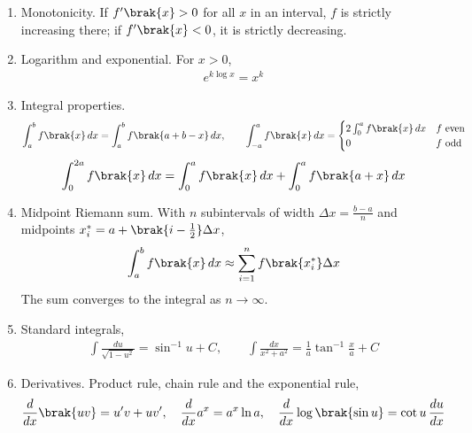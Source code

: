 \begin{enumerate}[label=\thesubsection.\arabic*, ref=\thesubsection.\theenumi]
\item Monotonicity. If $f^{\prime}\brak{x} > 0$ for all $x$ in an interval, $f$ is strictly increasing there; if $f^{\prime}\brak{x} < 0$, it is strictly decreasing. 
\item Logarithm and exponential. For $x > 0$,
\begin{align}
	e^{k\log x} = x^k \label{eq:CBSE12-explog}
\end{align}
\item Integral properties.
\begin{align}
	\int_a^b f\brak{x}\,dx = \int_a^b f\brak{a+b-x}\,dx, \qquad
	\int_{-a}^{a} f\brak{x}\,dx = \begin{cases} 2\int_0^a f\brak{x}\,dx & f \text{ even} \\ 0 & f \text{ odd} \end{cases} \label{eq:CBSE12-intprop}
\end{align}
\begin{align}
	\int_0^{2a} f\brak{x}\,dx = \int_0^{a} f\brak{x}\,dx + \int_0^{a} f\brak{a+x}\,dx \label{eq:CBSE12-split}
\end{align}
\item Midpoint Riemann sum. With $n$ subintervals of width $\Delta x = \frac{b-a}{n}$ and midpoints $x_i^* = a + \brak{i - \frac{1}{2}}\Delta x$,
\begin{align}
	\int_a^b f\brak{x}\,dx \approx \sum_{i=1}^{n} f\brak{x_i^*}\Delta x \label{eq:CBSE12-riemann}
\end{align}
The sum converges to the integral as $n \to \infty$. 
\item Standard integrals,
\begin{align}
	\int \frac{du}{\sqrt{1-u^2}} = \sin^{-1}u + C, \qquad
	\int \frac{dx}{x^2+a^2} = \frac{1}{a}\tan^{-1}\frac{x}{a} + C \label{eq:CBSE12-standard}
\end{align}

\item Derivatives. Product rule, chain rule and the exponential rule,
\begin{align}
	\frac{d}{dx}\brak{uv} = u^{\prime}v + uv^{\prime}, \quad
	\frac{d}{dx}a^x = a^x\ln a, \quad
	\frac{d}{dx}\log\brak{\sin u} = \cot u\,\frac{du}{dx} \label{eq:CBSE12-deriv}
\end{align}


\end{enumerate}
